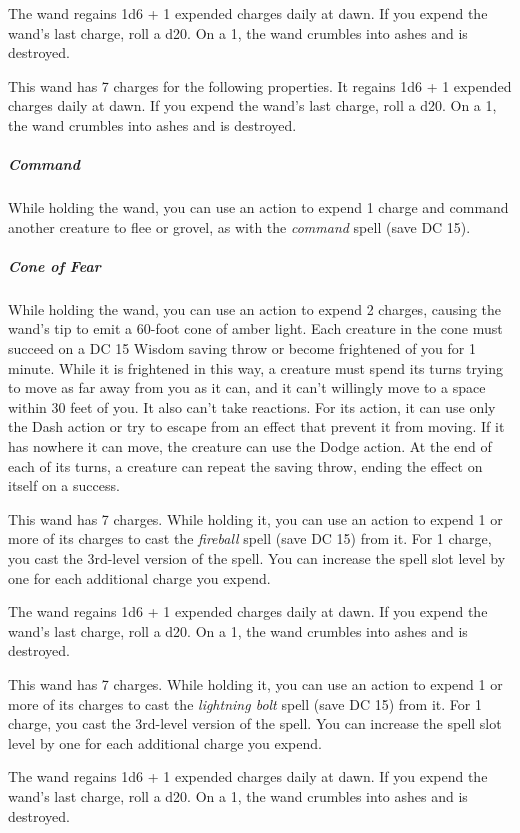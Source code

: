 \documentclass[10pt,a4paper,twoside,bg=print,twocolumn,openany,nodeprecatedcode]{dndbook}
\begin{document}
The wand regains 1d6 + 1 expended charges daily at dawn. If you expend the wand's last charge, roll a d20. On a 1, the wand crumbles into ashes and is destroyed.

This wand has 7 charges for the following properties. It regains 1d6 + 1 expended charges daily at dawn. If you expend the wand's last charge, roll a d20. On a 1, the wand crumbles into ashes and is destroyed.

\subparagraph{Command}
While holding the wand, you can use an action to expend 1 charge and command another creature to flee or grovel, as with the \textit{command} spell (save DC 15).

\subparagraph{Cone of Fear}
While holding the wand, you can use an action to expend 2 charges, causing the wand's tip to emit a 60-foot cone of amber light. Each creature in the cone must succeed on a DC 15 Wisdom saving throw or become frightened of you for 1 minute. While it is frightened in this way, a creature must spend its turns trying to move as far away from you as it can, and it can't willingly move to a space within 30 feet of you. It also can't take reactions. For its action, it can use only the Dash action or try to escape from an effect that prevent it from moving. If it has nowhere it can move, the creature can use the Dodge action. At the end of each of its turns, a creature can repeat the saving throw, ending the effect on itself on a success.

This wand has 7 charges. While holding it, you can use an action to expend 1 or more of its charges to cast the \textit{fireball} spell (save DC 15) from it. For 1 charge, you cast the 3rd-level version of the spell. You can increase the spell slot level by one for each additional charge you expend.

The wand regains 1d6 + 1 expended charges daily at dawn. If you expend the wand's last charge, roll a d20. On a 1, the wand crumbles into ashes and is destroyed.

This wand has 7 charges. While holding it, you can use an action to expend 1 or more of its charges to cast the \textit{lightning bolt} spell (save DC 15) from it. For 1 charge, you cast the 3rd-level version of the spell. You can increase the spell slot level by one for each additional charge you expend.

The wand regains 1d6 + 1 expended charges daily at dawn. If you expend the wand's last charge, roll a d20. On a 1, the wand crumbles into ashes and is destroyed.
\end{document}

